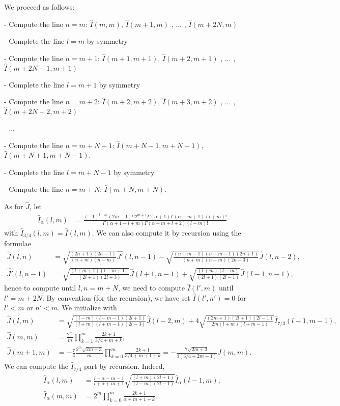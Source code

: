\documentclass[11pt]{article}
\newcommand{\hI}{\widehat{I}}
\newcommand{\hJ}{\widehat{J}}
\newcommand{\hJp}{\widehat{J'}}
\begin{document}
We proceed as follows:

- Compute the line $n=m$: $\hI(m,m)$, $\hI(m+1,m)$ , ... , $\hI(m+2N,m)$

- Complete the line $l=m$ by symmetry

- Compute the line $n=m+1$: $\hI(m+1,m+1)$, $\hI(m+2,m+1)$ , ... , $\hI(m+2N-1,m+1)$

- Complete the line $l=m+1$ by symmetry

- Compute the line $n=m+2$: $\hI(m+2,m+2)$, $\hI(m+3,m+2)$ , ... , $\hI(m+2N-2,m+2)$

- ...

- Compute the line $n=m+N-1$: $\hI(m+N-1,m+N-1)$, $\hI(m+N+1,m+N-1)$.

- Complete the line $l=m+N-1$ by symmetry

- Compute the line $n=m+N$: $\hI(m+N,m+N)$.

As for $\hJ$, let
\begin{align}
\hI_{\alpha}(l,m) &= \frac{(-1)^{l-m}(2m-1)!!2^{m+1}\Gamma(\alpha+1)\Gamma(\alpha+m+1)(l+m)!}{\Gamma(\alpha+1-l+m)\Gamma(\alpha+m+l+2)(l-m)!} 
\end{align}
with $\hI_{3/4}(l,m) =\hI(l,m)$. We can also compute it by recursion using the formulae
\begin{align*}
\hJ(l,n) &= \sqrt{\frac{(2n+1)(2n-1)}{(n+m)(n-m)}} \hJp(l,n-1)-\sqrt{\frac{(n+m-1)(n-m-1)(2n+1)}{(n+m)(n-m)(2n-3)}} \hJ(l,n-2) ,\\
\hJp(l,n-1) &= \sqrt{\frac{(l+m+1)(l-m+1)}{(2l+1)(2l+3)}} \hJ(l+1,n-1)+\sqrt{\frac{(l+m)(l-m)}{(2l+1)(2l-1)}} \hJ(l-1,n-1) ,
\end{align*}
hence to compute until $l,n=m+N$, we need to compute $\hI(l',m)$ until $l'=m+2N$. By convention (for the recursion), we have set $\hI(l',n')=0$ for $l'<m$ or  $n'<m$.
We initialize with
\begin{align*}
\hJ(l,m) &=\sqrt{\frac{(l-m)(l-m-1)(2l+1)}{(l+m)(l+m-1)(2l-3)}} \hJ(l-2,m)+ 4 \sqrt{\frac{(2m+1)(2l+1)(2l-1)}{2m(l+m)(l+m-1)}} \hI_{7/3}(l-1,m-1) ,\\
\hJ(m,m) &= \frac{2^m}{m} \prod_{k=1}^{m} \frac{2k+1}{3/4 + m + k} ,\\
\hJ(m+1,m) &= -\frac{7}{4}\frac{2^m\sqrt{2m+3}}{m} \prod_{k=0}^{m} \frac{2k+1}{3/4 + m + 1 +k} = -\frac{7\sqrt{2m+3}}{4(3/4+2m+1)} \hJ(m,m).
\end{align*}
We can compute the $\hI_{7/4}$ part by recursion. Indeed,
\begin{align}
\hI_{\alpha}(l,m) &= \frac{l-\alpha-m-1}{l+\alpha+m+1} \sqrt{\frac{(l+m)(2l+1)}{(l-m)(2l-1)}} \hI_{\alpha}(l-1,m) ,\\
\hI_{\alpha}(m,m) &= 2^m \prod_{k=0}^{m} \frac{2k+1}{\alpha + m + 1 + k} .
\end{align}
\end{document}
